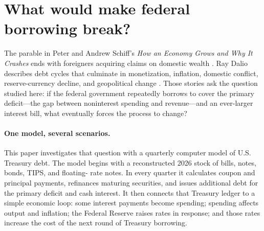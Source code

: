 \documentclass[11pt]{article}
\begin{document}
\begin{abstract}
The paper then gives that break a conditional recovery.  The central private-clearing path
ends 2039Q2 with inflation at 4.89 percent, debt at 178.82 percent of GDP, annualized interest
expense at 20.49 percent of GDP, and the Fed's short-rate setting at 8.72 percent.  Beginning
in 2039Q3, a joint settlement is assumed to lower marginal Treasury rates gradually, permit
inflation to peak at 5.2 percent, and cause one year of negative 1-percent real growth.  The
cohort solver finds that a permanent primary-balance improvement of 5.48 percent of GDP,
phased in over four years, returns debt/GDP to 178.82 percent by 2056 and leaves it falling.
Debt first peaks at 209.27 percent in 2043; interest expense declines to 8.88 percent of GDP
and inflation to 2.5 percent by 2056.  The same favorable growth, inflation, and rate paths
without the fiscal package end at 265.14 percent debt/GDP.  The recovery's macro and yield
paths are declared assumptions; the required fiscal adjustment and Treasury cash flows are
the computed results.  In this conditional history, financing stops at the supplied
boundary and an assumed settlement replaces the later double-digit-inflation path
with a conditional recovery.
\end{abstract}

\section{What would make federal borrowing break?}

The parable in Peter and Andrew Schiff's \emph{How an Economy Grows and Why It Crashes}
ends with foreigners acquiring claims on domestic wealth \cite{schiff}.  Ray Dalio describes
debt cycles that culminate in monetization, inflation, domestic conflict, reserve-currency
decline, and geopolitical change \cite{dalioChangingOrder,dalioDebtCycle}.  Those stories ask
the question studied here: if the federal government repeatedly borrows to cover the primary
deficit---the gap between noninterest spending and revenue---and an ever-larger interest bill,
what eventually forces the process to change?

\paragraph{One model, several scenarios.}
This paper investigates that question with a quarterly computer model of U.S. Treasury debt.
The model begins with a reconstructed 2026 stock of bills, notes, bonds, TIPS, and floating-
rate notes.  In every quarter it calculates coupon and principal payments, refinances maturing
securities, and issues additional debt for the primary deficit and cash interest.  It then
connects that Treasury ledger to a simple economic loop: some interest payments become
spending; spending affects output and inflation; the Federal Reserve raises rates in response;
and those rates increase the cost of the next round of Treasury borrowing.
\end{document}
